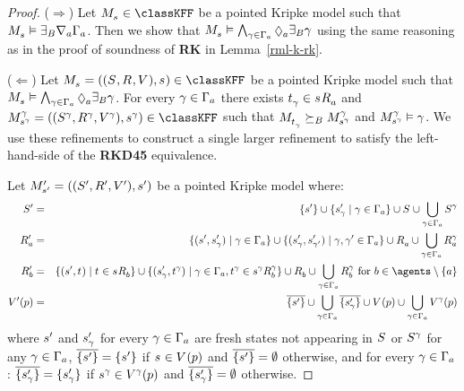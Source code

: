 \begin{proof}
($\Rightarrow$) Let $\kPModel{\kStateS} \in \classKFF$ be a pointed Kripke model such that $\kPModel{\kStateS} \entails \somerefsBs \coversA \Gamma_\agentA$.
Then we show that $\kPModel{\kStateS} \entails \bigwedge_{\gamma \in \Gamma_\agentA} \possibleA \somerefsBs \gamma$ using the same reasoning as in the proof of soundness of {\bf RK} in Lemma~\ref{rml-k-rk}.

($\Leftarrow$) Let $\kPModelAndTuple{\kStateS} \in \classKFF$ be a pointed Kripke model such that $\kPModel{\kStateS} \entails \bigwedge_{\gamma \in \Gamma_\agentA} \possibleA \somerefsBs \gamma$.
For every $\gamma \in \Gamma_\agentA$ there exists $\kStateT_\gamma \in \kSuccessorsA{\kStateS}$ and $\kPModelAndTuple[\gamma]{\kStateS[\gamma]} \in \classKFF$ such that $\kPModel{\kStateT_\gamma} \simulatesBs \kPModel[\gamma]{\kStateS[\gamma]}$ and $\kPModel[\gamma]{\kStateS[\gamma]} \entails \gamma$.
We use these refinements to construct a single larger refinement to satisfy the left-hand-side of the {\bf RKD45} equivalence.

Let $\kPModelAndTupleP{\kStateSP}$ be a pointed Kripke model where:
\begin{eqnarray*}
    \kStatesP &=& \{\kStateSP\} \cup \{\kStateSP_\gamma \mid \gamma \in \Gamma_\agentA\} \cup \kStates \cup \bigcup_{\gamma \in \Gamma_\agentA} \kStates[\gamma]\\
    \kAccessibilityPA &=& \{(\kStateSP, \kStateSP_\gamma) \mid \gamma \in \Gamma_\agentA\} \cup \{(\kStateSP_\gamma, \kStateSP_{\gamma'}) \mid \gamma, \gamma' \in \Gamma_\agentA\} \cup \kAccessibilityA \cup \bigcup_{\gamma \in \Gamma_\agentA} \kAccessibilityA[\gamma]\\
    \kAccessibilityPB &=& \{(\kStateSP, \kStateT) \mid \kStateT \in \kSuccessorsB{\kStateS}\} \cup \{(\kStateSP_\gamma, \kStateT[\gamma]) \mid \gamma \in \Gamma_\agentA, \kStateT[\gamma] \in \kSuccessorsB[\gamma]{\kStateS[\gamma]}\} \cup \kAccessibilityB \cup \bigcup_{\gamma \in \Gamma_\agentA} \kAccessibilityB[\gamma] \text{ for } \agentB \in \agents \setminus \{\agentA\}\\
    \kValuationP(\atomP) &=& \overline{\{\kStateSP\}} \cup \bigcup_{\gamma \in \Gamma_\agentA} \overline{\{\kStateSP_\gamma\}} \cup \kValuation(\atomP) \cup \bigcup_{\gamma \in \Gamma_\agentA} \kValuation[\gamma](\atomP)
\end{eqnarray*}
where $\kStateSP$ and $\kStateSP_\gamma$ for every $\gamma \in \Gamma_\agentA$ are fresh states not appearing in $\kStates$ or $\kStates[\gamma]$ for any $\gamma \in \Gamma_\agentA$, $\overline{\{\kStateSP\}} = \{\kStateSP\}$ if $\kStateS \in \kValuation(\atomP)$ and $\overline{\{\kStateSP\}} = \emptyset$ otherwise, and for every $\gamma \in \Gamma_\agentA$: $\overline{\{\kStateSP_\gamma\}} = \{\kStateSP_\gamma\}$ if $\kStateS[\gamma] \in \kValuation[\gamma](\atomP)$ and $\overline{\{\kStateSP_\gamma\}} = \emptyset$ otherwise.


\end{proof}
